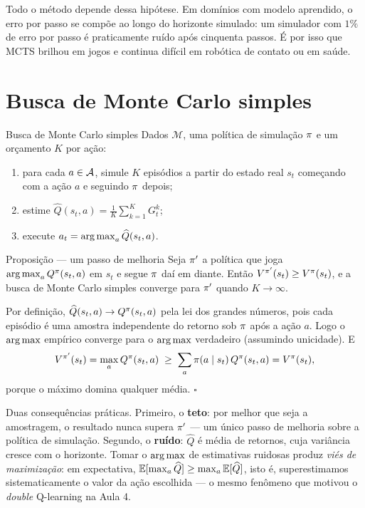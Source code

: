 \documentclass[a4paper, 11pt]{article}
\newcommand{\Mmod}{\mathcal{M}}
\newcommand{\Qh}{\widehat{Q}}
\newcommand{\ret}{G}
\begin{document}
\begin{alertabox}
Todo o método depende dessa hipótese. Em domínios com modelo aprendido, o erro
por passo se compõe ao longo do horizonte simulado: um simulador com $1\%$ de
erro por passo é praticamente ruído após cinquenta passos. É por isso que MCTS
brilhou em jogos e continua difícil em robótica de contato ou em saúde.
\end{alertabox}

\section{Busca de Monte Carlo simples}

\begin{algbox}{Busca de Monte Carlo simples}
Dados $\Mmod$, uma política de simulação $\pi$ e um orçamento $K$ por ação:
\begin{enumerate}
  \item para cada $a\in\mathcal{A}$, simule $K$ episódios a partir do estado real $s_t$
        começando com a ação $a$ e seguindo $\pi$ depois;
  \item estime $\displaystyle \Qh(s_t,a) = \frac1K\sum_{k=1}^K \ret^k_t$;
  \item execute $a_t = \argmax_a \Qh(s_t,a)$.
\end{enumerate}
\end{algbox}

\begin{teobox}{Proposição --- um passo de melhoria}
Seja $\pi'$ a política que joga $\operatorname*{arg\,max}_a Q^{\pi}(s_t,a)$ em $s_t$ e segue $\pi$
daí em diante. Então $V^{\pi'}(s_t) \ge V^{\pi}(s_t)$, e a busca de Monte Carlo
simples converge para $\pi'$ quando $K\to\infty$.
\end{teobox}

\begin{provabox}
Por definição, $\Qh(s_t,a) \to \Qpi(s_t,a)$ pela lei dos grandes números, pois
cada episódio é uma amostra independente do retorno sob $\pi$ após a ação $a$.
Logo o $\operatorname*{arg\,max}$ empírico converge para o $\operatorname*{arg\,max}$ verdadeiro (assumindo
unicidade). E
\[
  V^{\pi'}(s_t) = \max_a Q^{\pi}(s_t,a)
  \;\ge\; \sum_a \pi(a\mid s_t)\, Q^{\pi}(s_t,a) = V^{\pi}(s_t),
\]
porque o máximo domina qualquer média. \hfill$\square$
\end{provabox}

Duas consequências práticas. Primeiro, o \textbf{teto}: por melhor que seja a
amostragem, o resultado nunca supera $\pi'$ --- um único passo de melhoria
sobre a política de simulação. Segundo, o \textbf{ruído}: $\Qh$ é média de
retornos, cuja variância cresce com o horizonte. Tomar o $\operatorname*{arg\,max}$ de
estimativas ruidosas produz \emph{viés de maximização}: em expectativa,
$\E[\max_a \Qh] \ge \max_a \E[\Qh]$, isto é, superestimamos sistematicamente o
valor da ação escolhida --- o mesmo fenômeno que motivou o \emph{double}
Q-learning na Aula 4.
\end{document}
